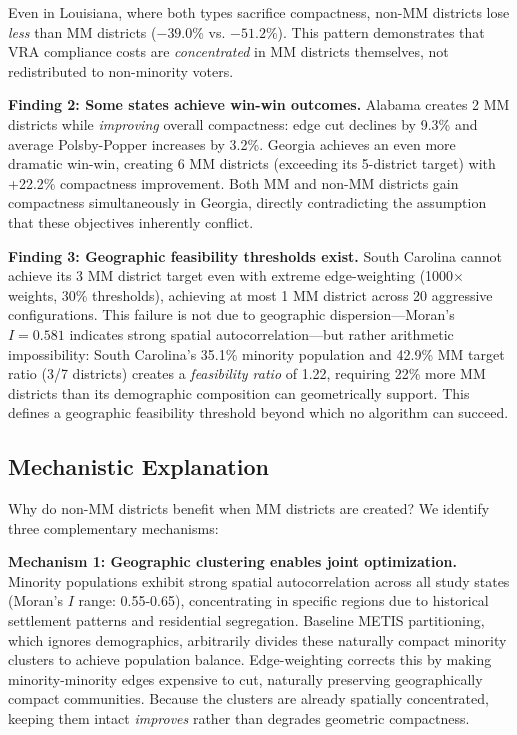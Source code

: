 Even in Louisiana, where both types sacrifice compactness, non-MM districts lose \emph{less} than MM districts ($-39.0\%$ vs. $-51.2\%$). This pattern demonstrates that VRA compliance costs are \emph{concentrated} in MM districts themselves, not redistributed to non-minority voters.

\textbf{Finding 2: Some states achieve win-win outcomes.} Alabama creates 2 MM districts while \emph{improving} overall compactness: edge cut declines by 9.3\% and average Polsby-Popper increases by 3.2\%. Georgia achieves an even more dramatic win-win, creating 6 MM districts (exceeding its 5-district target) with +22.2\% compactness improvement. Both MM and non-MM districts gain compactness simultaneously in Georgia, directly contradicting the assumption that these objectives inherently conflict.

\textbf{Finding 3: Geographic feasibility thresholds exist.} South Carolina cannot achieve its 3 MM district target even with extreme edge-weighting (1000$\times$ weights, 30\% thresholds), achieving at most 1 MM district across 20 aggressive configurations. This failure is not due to geographic dispersion---Moran's $I = 0.581$ indicates strong spatial autocorrelation---but rather arithmetic impossibility: South Carolina's 35.1\% minority population and 42.9\% MM target ratio (3/7 districts) creates a \emph{feasibility ratio} of 1.22, requiring 22\% more MM districts than its demographic composition can geometrically support. This defines a geographic feasibility threshold beyond which no algorithm can succeed.

\subsection{Mechanistic Explanation}

Why do non-MM districts benefit when MM districts are created? We identify three complementary mechanisms:

\textbf{Mechanism 1: Geographic clustering enables joint optimization.} Minority populations exhibit strong spatial autocorrelation across all study states (Moran's $I$ range: 0.55-0.65), concentrating in specific regions due to historical settlement patterns and residential segregation. Baseline METIS partitioning, which ignores demographics, arbitrarily divides these naturally compact minority clusters to achieve population balance. Edge-weighting corrects this by making minority-minority edges expensive to cut, naturally preserving geographically compact communities. Because the clusters are already spatially concentrated, keeping them intact \emph{improves} rather than degrades geometric compactness.

